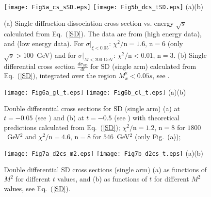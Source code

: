 \documentclass[12pt]{article}
\begin{document}
\begin{figure}[p]
  \centering
  \texttt{[image: Fig5a\_cs\_sSD.eps]}
  \texttt{[image: Fig5b\_dcs\_tSD.eps]}
  {(a)\hspace{0.5\linewidth}(b)}
  \caption{(a) Single diffraction dissociation cross section vs. energy $\sqrt{s}$ calculated from Eq.~(\ref{SD}). The data are from \cite{Poghosyan for ALICE, [tmp6].Ansorge.UA5, Bernard.UA4.1987, Amos.E710.1992, Abe.CDF.1993} (high energy data), and \cite{lowSD.Cool, lowSD.Schamberger, lowSD.Albrow, lowSD.Armitage} (low energy data). For $\sigma|_{\xi<0.05}$: $\chi^2/$n$=1.6$, n$=6$ (only $\sqrt{s}>100$~GeV) and for $\sigma|_{M<200\mbox{~GeV}}$: $\chi^2/$n$<0.01$, n$=3$. \hspace{4mm}  
  (b) Single differential cross section $\frac{d\sigma_\mathrm{SD}}{dt}$ for SD (single arm) calculated from Eq.~(\ref{SD}), integrated over the region $M_x^2<0.05s$, see \cite{Bernard.UA4.1987}.}
 \label{fig:cs|dcsdt.SD.Data}
\end{figure}
\begin{figure}[p] %
  \centering
  \texttt{[image: Fig6a\_gl\_t.eps]}
  \texttt{[image: Fig6b\_cl\_t.eps]}
   {(a)\hspace{0.47\linewidth}(b)}
  \caption{Double differential cross sections for SD (single arm) (a) at $t=-0.05$ (see \cite{Abe.CDF.1993, GoulianosMomtanha}) and (b) at $t=-0.5$ (see \cite{Bozzo.SD_t0.55}) with theoretical predictions calculated from Eq.~(\ref{SD}); $\chi^2/$n$=1.2$, n$=8$ for $1800$~GeV$^2$ and $\chi^2/$n$=4.6$, n$=8$ for $546$~GeV$^2$  (only Fig.~(a));}
 \label{fig:d2cs.SD.Data}
\end{figure}
\newpage
\begin{figure}[p] %
 \centering
 \texttt{[image: Fig7a\_d2cs\_m2.eps]}
 \texttt{[image: Fig7b\_d2cs\_t.eps]}
  {(a)\hspace{0.47\linewidth}(b)}
 \caption{Double differential SD cross sections (single arm) (a) as functions of $M^2$ for different $t$ values, and (b) as functions of $t$ for different $M^2$ values, see Eq.~(\ref{SD}).}
 \label{d2cs_m2.in.t}
\end{figure}
\end{document}
